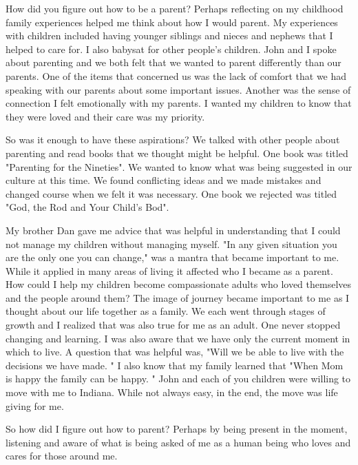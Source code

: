 How did you figure out how to be a parent?
Perhaps reflecting on my childhood family experiences helped me think about how I would parent.
My experiences with children included having younger siblings and nieces and nephews that I helped to care for.
I also babysat for other people's children.
John and I spoke about parenting and we both felt that we wanted to parent differently than our parents.
One of the items that concerned us was the lack of comfort that we had speaking with our parents about some important issues.
Another was the sense of connection I felt emotionally with my parents.
I wanted my children to know that they were loved and their care was my priority.

So was it enough to have these aspirations? We talked with other people about parenting and read books that we thought might be helpful.
One book was titled "Parenting for the Nineties".
We wanted to know what was being suggested in our culture at this time.
We found conflicting ideas and we made mistakes and changed course when we felt it was necessary.
One book we rejected was titled "God, the Rod and Your Child's Bod".

My brother Dan gave me advice that was helpful in understanding that I could not manage my children without managing myself.
"In any given situation you are the only one you can change," was a mantra that became important to me.
While it applied in many areas of living it affected who I became as a parent.
How could I help my children become compassionate adults who loved themselves and the people around them?
The image of journey became important to me as I thought about our life together as a family.
We each went through stages of growth and I realized that was also true for me as an adult.
One never stopped changing and learning.
I was also aware that we have only the current moment in which to live.
A question that was helpful was, "Will we be able to live with the decisions we have made.
" I also know that my family learned that "When Mom is happy the family can be happy.
" John and each of you children were willing to move with me to Indiana.
While not always easy, in the end, the move was life giving for me.

So how did I figure out how to parent? Perhaps by being present in the moment, listening and aware of what is being asked of me as a human being who loves and cares for those around me.





